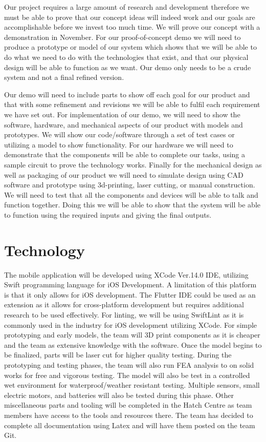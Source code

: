 \documentclass{article}
\begin{document}
	Our project requires a large amount of research and development therefore we must be able to prove that our concept ideas will indeed work and our goals are accomplishable before we invest too much time. We will prove our concept with a demonstration in November. For our proof-of-concept demo we will need to produce a prototype or model of our system which shows that we will be able to do what we need to do with the technologies that exist, and that our physical design will be able to function as we want. Our demo only needs to be a crude system and not a final refined version.  

	Our demo will need to include parts to show off each goal for our product and that with some refinement and revisions we will be able to fulfil each requirement we have set out. For implementation of our demo, we will need to show the software, hardware, and mechanical aspects of our product with models and prototypes. We will show our code/software through a set of test cases or utilizing a model to show functionality. For our hardware we will need to demonstrate that the components will be able to complete our tasks, using a sample circuit to prove the technology works. Finally for the mechanical design as well as packaging of our product we will need to simulate design using CAD software and prototype using 3d-printing, laser cutting, or manual construction. We will need to test that all the components and devices will be able to talk and function together. Doing this we will be able to show that the system will be able to function using the required inputs and giving the final outputs.

\section{Technology}

	The mobile application will be developed using XCode Ver.14.0 IDE, utilizing Swift programming language for iOS Development. A limitation of this platform is that it only allows for iOS development. The Flutter IDE could be used as an extension as it allows for cross-platform development but requires additional research to be used effectively. For linting, we will be using SwiftLint as it is commonly used in the industry for iOS development utilizing XCode. For simple prototyping and early models, the team will 3D print components as it is cheaper and the team as extensive knowledge with the software. Once the model begins to be finalized, parts will be laser cut for higher quality testing. During the prototyping and testing phases, the team will also run FEA analysis to on solid works for free and vigorous testing. The model will also be test in a controlled wet environment for waterproof/weather resistant testing. Multiple sensors, small electric motors, and batteries will also be tested during this phase. Other miscellaneous parts and tooling will be completed in the Hatch Centre as team members have access to the tools and resources there. The team has decided to complete all documentation using Latex and will have them posted on the team Git. 
\end{document}
